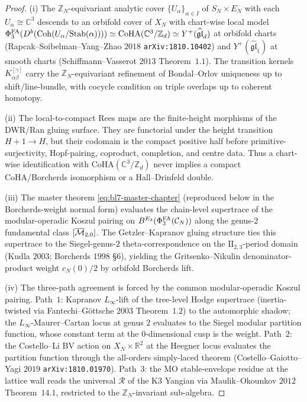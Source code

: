 \begin{proof}
(i) The $\mathbb{Z}_N$-equivariant analytic cover
$\{U_\alpha\}_{\alpha \in I}$ of $S_N \times E_N$ with each
$U_\alpha \cong \mathbb{C}^3$ descends to an orbifold cover of $X_N$
with chart-wise local model
$\Phi^{\mathrm{FA}}_{3}(D^b(\mathrm{Coh}(U_\alpha / \mathrm{Stab}(\alpha)))) \simeq
\mathrm{CoHA}(\mathbb{C}^3 / \mathbb{Z}_d) \simeq
Y^+(\widehat{\mathfrak{gl}}_d)$ at orbifold charts
(Rapcak--Soibelman--Yang--Zhao $2018$ \texttt{arXiv:1810.10402}) and
$Y^+(\widehat{\mathfrak{gl}}_1)$ at smooth charts
(Schiffmann--Vasserot $2013$ Theorem~$1.1$). The transition kernels
$K_{\alpha\beta}^{[\gamma]}$ carry the $\mathbb{Z}_N$-equivariant
refinement of Bondal--Orlov uniqueness up to
shift/line-bundle, with cocycle condition on triple overlaps up to
coherent homotopy.

(ii) The local-to-compact Rees maps are the finite-height morphisms of
the DWR/Ran gluing surface. They are functorial under the height
transition \(H+1\to H\), but their codomain is the compact positive
half before primitive-surjectivity, Hopf-pairing, coproduct,
completion, and centre data. Thus a chart-wise identification with
\(\mathrm{CoHA}(\mathbb C^3/\mathbb Z_d)\) never implies a compact
CoHA/Borcherds isomorphism or a Hall--Drinfeld double.

(iii) The master theorem
\eqref{eq:bl7-master-chapter} (reproduced below in the
Borcherds-weight normal form) evaluates the chain-level supertrace
of the modular-operadic Koszul pairing on $B^{E_{3}}(\Phi^{\mathrm{FA}}_{3}(\mathcal{C}_N))$
along the genus-$2$ fundamental class $[\overline{\mathcal{M}}_{2, 0}]$. The
Getzler--Kapranov gluing structure ties this supertrace to the
Siegel-genus-$2$ theta-correspondence on the
$\mathrm{II}_{2, 3}$-period domain (Kudla $2003$; Borcherds $1998$
\S$6$), yielding the Gritsenko--Nikulin denominator-product weight
$c_N(0)/2$ by orbifold Borcherds lift.

(iv) The three-path agreement is forced by the common modular-operadic
Koszul pairing. Path~$1$: Kapranov $L_\infty$-lift of the tree-level
Hodge supertrace (inertia-twisted via Fantechi--G\"ottsche $2003$
Theorem~$1.2$) to the automorphic shadow; the $L_\infty$-Maurer--Cartan
locus at genus $2$ evaluates to the Siegel modular partition function,
whose constant term at the $0$-dimensional cusp is the weight. Path~$2$:
the Costello--Li BV action on $X_N \times \mathbb{R}^2$ at the Heegner
locus evaluates the partition function through the
all-orders simply-laced theorem (Costello--Gaiotto--Yagi $2019$
\texttt{arXiv:1810.01970}). Path~$3$: the MO stable-envelope residue at
the lattice wall reads the universal $\mathcal{R}$ of the K$3$ Yangian
via Maulik--Okounkov $2012$ Theorem~$14.1$, restricted to the
$\mathbb{Z}_N$-invariant sub-algebra.
\end{proof}

